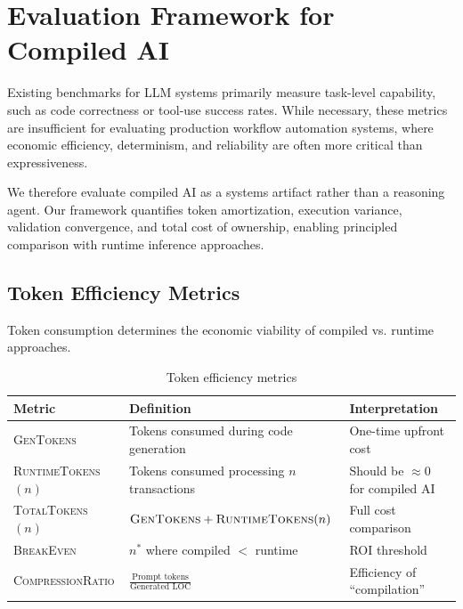 \documentclass[11pt]{article}
\newcommand{\metric}[1]{\textsc{#1}}
\begin{document}
\section{Evaluation Framework for Compiled AI}
\label{sec:framework}

Existing benchmarks for LLM systems primarily measure task-level capability, such as code correctness or tool-use success rates. While necessary, these metrics are insufficient for evaluating production workflow automation systems, where economic efficiency, determinism, and reliability are often more critical than expressiveness.

We therefore evaluate compiled AI as a systems artifact rather than a reasoning agent. Our framework quantifies token amortization, execution variance, validation convergence, and total cost of ownership, enabling principled comparison with runtime inference approaches.

\subsection{Token Efficiency Metrics}

Token consumption determines the economic viability of compiled vs. runtime approaches.

\begin{table}[ht]
\centering
\caption{Token efficiency metrics}
\label{tab:token-metrics}
\begin{tabular}{p{3.5cm}p{4cm}p{4.5cm}}
\toprule
Metric & Definition & Interpretation \\
\midrule
\metric{GenTokens} & Tokens consumed during code generation & One-time upfront cost \\
\metric{RuntimeTokens}$(n)$ & Tokens consumed processing $n$ transactions & Should be $\approx 0$ for compiled AI \\
\metric{TotalTokens}$(n)$ & $\text{\metric{GenTokens}} + \text{\metric{RuntimeTokens}}(n)$ & Full cost comparison \\
\metric{BreakEven} & $n^*$ where compiled $<$ runtime & ROI threshold \\
\metric{CompressionRatio} & $\frac{\text{Prompt tokens}}{\text{Generated LOC}}$ & Efficiency of ``compilation'' \\
\bottomrule
\end{tabular}
\end{table}
\end{document}
